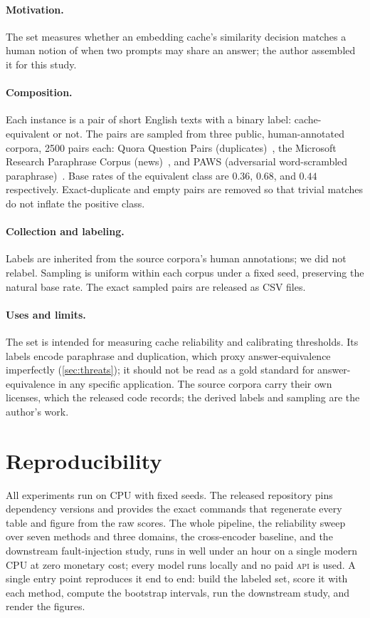 \paragraph{Motivation.}
The set measures whether an embedding cache's similarity decision matches a human notion of
when two prompts may share an answer; the author assembled it for this study.

\paragraph{Composition.}
Each instance is a pair of short English texts with a binary label: cache-equivalent or not.
The pairs are sampled from three public, human-annotated corpora,
\mbox{2500} pairs each: Quora Question Pairs (duplicates)~\cite{wang2019glue}, the
Microsoft Research Paraphrase Corpus (news)~\cite{dolan2005mrpc}, and \mbox{PAWS}
(adversarial word-scrambled paraphrase)~\cite{zhang2019paws}. Base rates of the equivalent
class are $0.36$, $0.68$, and $0.44$ respectively. Exact-duplicate and empty pairs are
removed so that trivial matches do not inflate the positive class.

\paragraph{Collection and labeling.}
Labels are inherited from the source corpora's human annotations; we did not relabel. Sampling
is uniform within each corpus under a fixed seed, preserving the natural base rate. The exact
sampled pairs are released as CSV files.

\paragraph{Uses and limits.}
The set is intended for measuring cache reliability and calibrating thresholds. Its labels
encode paraphrase and duplication, which proxy answer-equivalence imperfectly
(\cref{sec:threats}); it should not be read as a gold standard for answer-equivalence in any
specific application. The source corpora carry their own licenses, which the released code
records; the derived labels and sampling are the author's work.

\section{Reproducibility}
\label{app:repro}

All experiments run on CPU with fixed seeds. The released repository pins dependency versions
and provides the exact commands that regenerate every table and figure from the raw scores. The
whole pipeline, the reliability sweep over seven methods and three domains, the cross-encoder
baseline, and the downstream fault-injection study, runs in well under an hour on a single
modern CPU at zero monetary cost; every model runs locally and no paid \textsc{api} is used. A
single entry point reproduces it end to end: build the labeled set, score it with each method,
compute the bootstrap intervals, run the downstream study, and render the figures.

